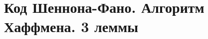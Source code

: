 \documentclass[discrete.tex]{subfiles}
\begin{document}
\section{Код Шеннона-Фано. Алгоритм Хаффмена. 3 леммы}
\end{document}
